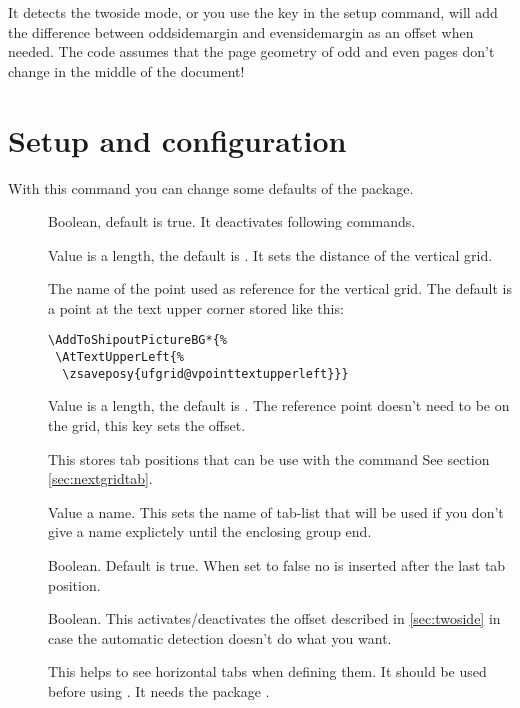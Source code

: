 \documentclass[twoside,parskip=half-,fontsize=12pt,egregdoesnotlikesansseriftitles,headings=normal]{scrartcl}
\begin{document}
It  detects the twoside mode, or you use the  key in the setup command,  will add the difference between oddsidemargin and evensidemargin as an offset when needed. The code assumes that the page geometry of odd and even pages don't change in the middle of the document!



\section{Setup and configuration}\label{sec:setup}

\DescribeMacro{}

With this command you can change some defaults of the package.

\begin{description}
\item[] Boolean, default is true. It deactivates following  commands.

\item[] Value is a length, the default is . It sets the distance of the vertical grid.

\item[] The name of the point used as reference for the vertical grid. The default is a point at the text upper corner stored like this:

\begin{lstlisting}
\AddToShipoutPictureBG*{%
 \AtTextUpperLeft{%
  \zsaveposy{ufgrid@vpointtextupperleft}}}
\end{lstlisting}

\item[] Value is a length, the default is . The reference point doesn't need to be on the grid, this key sets the offset.

\item[] This stores tab positions that can be use with the  command See section \ref{sec:nextgridtab}.

\item[] Value a name. This sets the name of tab-list that will be used if you don't give a name explictely until the enclosing group end.

\item[] Boolean. Default is true. When set to false no \cs{\hfill} is inserted after the last tab position.

\item[] Boolean. This activates/deactivates the offset described in \ref{sec:twoside} in case the automatic detection doesn't do what you want.

 \item[] This helps to see horizontal tabs when defining them. It should be used before using   . It needs the package .
\end{description}
\end{document}

